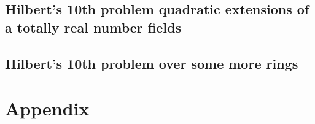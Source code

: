 \documentclass[10pt,a4paper]{scrbook}
\numberwithin{equation}{section}
\begin{document}
\section{Hilbert's 10th problem quadratic extensions of a totally real number fields}


\section{Hilbert's 10th problem over some more rings}


\clearpage
\appendix
\chapter{Appendix}\label{sec:Appendix}
%

\backmatter
\vspace{\fill}
\printbibliography

\listoftodos
\end{document}
